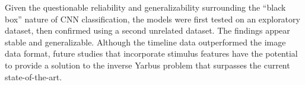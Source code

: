 \documentclass[
  english,
  man]{apa6}
\begin{document}
Given the questionable reliability and generalizability surrounding the \enquote{black box} nature of CNN classification, the models were first tested on an exploratory dataset, then confirmed using a second unrelated dataset. The findings appear stable and generalizable. Although the timeline data outperformed the image data format, future studies that incorporate stimulus features have the potential to provide a solution to the inverse Yarbus problem that surpasses the current state-of-the-art.

\newpage

\begingroup
\setlength{\parindent}{-0.5in}
\setlength{\leftskip}{0.5in}

\hypertarget{refs}{}

\endgroup
\end{document}
